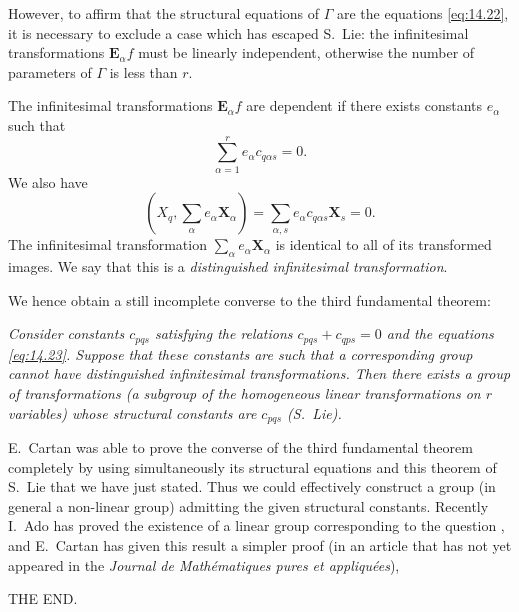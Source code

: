 \documentclass[leqno,11pt]{book}
\numberwithin{equation}{chapter}
\theoremstyle{shape1}
\theoremstyle{shapesmall}
\newcommand{\somespace}{\vspace{9pt}}
\begin{document}
However, to affirm that the structural equations of $\Gamma$ are the equations \eqref{eq:14.22}, it is necessary to exclude a case which has escaped S.~Lie: the infinitesimal transformations $\mathbf{E}_{\alpha}f$ must be linearly independent, otherwise the number of parameters of $\Gamma$ is less than $r$.

The infinitesimal transformations $\mathbf{E}_{\alpha}f$ are dependent if there exists constants $e_{\alpha}$ such that
\[
\sum_{\alpha=1}^{r}e_{\alpha}c_{q\alpha s}=0.
\]
We also have
\[
\left(X_{q},\sum_{\alpha}e_{\alpha}\mathbf{X}_{\alpha}\right)=\sum_{\alpha,s}e_{\alpha}c_{q\alpha s}\mathbf{X}_{s}=0.
\]
The infinitesimal transformation $\sum_{\alpha}e_{\alpha}\mathbf{X}_{\alpha}$ is identical to all of its transformed images. We say that this is a \emph{distinguished infinitesimal transformation}.

We hence obtain a still incomplete converse to the third fundamental theorem:

\somespace

\emph{Consider constants $c_{pqs}$ satisfying the relations $c_{pqs}+c_{qps}=0$ and the equations \eqref{eq:14.23}. Suppose that these constants are such that a corresponding group cannot have distinguished infinitesimal transformations. Then there exists a group of transformations (a subgroup of the homogeneous linear transformations on $r$ variables) whose structural constants are $c_{pqs}$ (S.~Lie).}

\somespace

E.~Cartan \cite{14, 19} was able to prove the converse of the third fundamental theorem completely by using simultaneously its structural equations and this theorem of S.~Lie that we have just stated. Thus we could effectively construct a group (in general a non-linear group) admitting the given structural constants. Recently I.~Ado has proved the existence of a linear group corresponding to the question \cite{21}, and E.~Cartan has given this result a simpler proof (in an article that has not yet appeared in the \emph{Journal de Mathématiques pures et appliquées}),

\somespace

\somespace

\begin{center}
  THE END.
\end{center}

\appendix
\end{document}

